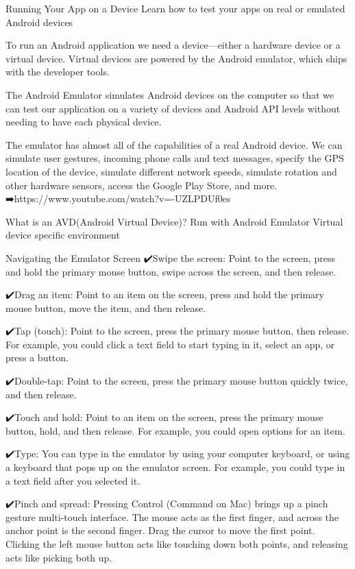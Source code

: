 Running Your App on a Device
        Learn how to test your apps on real or emulated Android devices

        To run an Android application we need a device—either a hardware device or a virtual device. Virtual devices are powered by the Android emulator, which ships with the developer tools.

        The Android Emulator simulates Android devices on the computer so that we can test our application on a variety of devices and Android API levels without needing to have each physical device.

        The emulator has almost all of the capabilities of a real Android device. We can simulate user gestures, incoming phone calls and text messages, specify the GPS location of the device, simulate different network speeds, simulate rotation and other hardware sensors, access the Google Play Store, and more.
            ➡️https://www.youtube.com/watch?v=-UZLPDUf0es

    What is an AVD(Android Virtual Device)?
        Run with Android Emulator
        Virtual device specific environment

    Navigating the Emulator Screen
        ✔️Swipe the screen: Point to the screen, press and hold the primary mouse button, swipe across the screen, and then release.

        ✔️Drag an item: Point to an item on the screen, press and hold the primary mouse button, move the item, and then release.

        ✔️Tap (touch): Point to the screen, press the primary mouse button, then release. For example, you could click a text field to start typing in it, select an app, or press a button.

        ✔️Double-tap: Point to the screen, press the primary mouse button quickly twice, and then release.

        ✔️Touch and hold: Point to an item on the screen, press the primary mouse button, hold, and then release. For example, you could open options for an item.

        ✔️Type: You can type in the emulator by using your computer keyboard, or using a keyboard that pops up on the emulator screen. For example, you could type in a text field after you selected it.

        ✔️Pinch and spread: Pressing Control (Command on Mac) brings up a pinch gesture multi-touch interface. The mouse acts as the first finger, and across the anchor point is the second finger. Drag the cursor to move the first point. Clicking the left mouse button acts like touching down both points, and releasing acts like picking both up.

